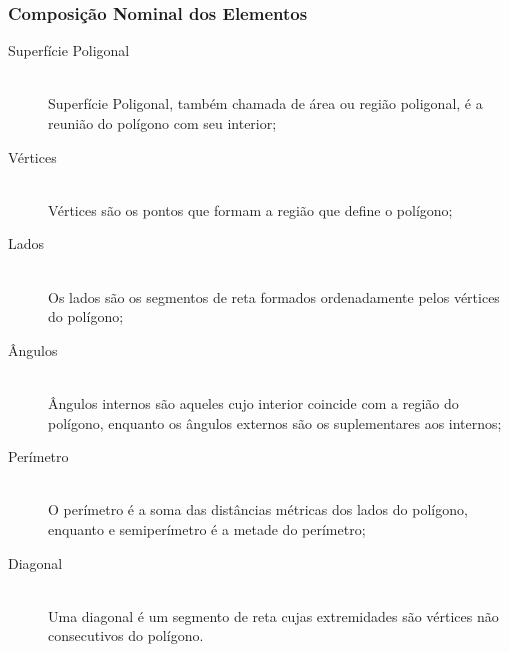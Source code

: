     \subsubsection{Composição Nominal dos Elementos}
        \begin{description}
            \item[Superfície Poligonal] \hfill \\
                Superfície Poligonal, também chamada de área ou região poligonal, é a reunião do polígono com seu interior;
            \item[Vértices] \hfill \\
                Vértices são os pontos que formam a região que define o polígono;
            \item[Lados] \hfill \\
                Os lados são os segmentos de reta formados ordenadamente pelos vértices do polígono;
            \item[Ângulos] \hfill \\
                Ângulos internos são aqueles cujo interior coincide com a região do polígono, enquanto os ângulos externos são os suplementares aos internos;
            \item[Perímetro] \hfill \\
                O perímetro é a soma das distâncias métricas dos lados do polígono, enquanto e semiperímetro é a metade do perímetro;
            \item[Diagonal] \hfill \\
                Uma diagonal é um segmento de reta cujas extremidades são vértices não consecutivos do polígono.
        \end{description}
